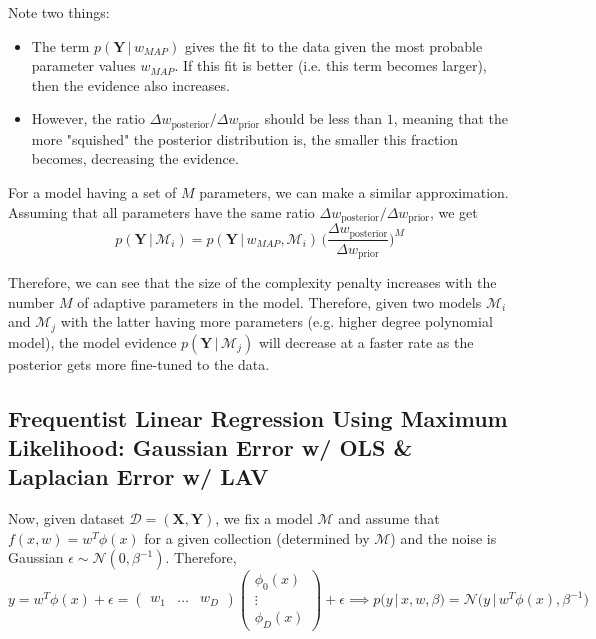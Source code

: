   Note two things:
  \begin{itemize}
    \item The term $p(\mathbf{Y}\,|\,w_{MAP})$ gives the fit to the data given the most probable parameter values $w_{MAP}$. If this fit is better (i.e. this term becomes larger), then the evidence also increases.
    \item However, the ratio $\Delta w_{\text{posterior}}/\Delta w_{\text{prior}}$ should be less than $1$, meaning that the more "squished" the posterior distribution is, the smaller this fraction becomes, decreasing the evidence.
  \end{itemize}

  For a model having a set of $M$ parameters, we can make a similar approximation. Assuming that all parameters have the same ratio $\Delta w_{\text{posterior}}/\Delta w_{\text{prior}}$, we get
  \begin{equation}
    p(\mathbf{Y}\,|\,\mathcal{M}_i) = p(\mathbf{Y}\,|\, w_{MAP}, \mathcal{M}_i) \, \bigg(\frac{\Delta w_{\text{posterior}}}{\Delta w_{\text{prior}}} \bigg)^M
  \end{equation}

  Therefore, we can see that the size of the complexity penalty increases with the number $M$ of adaptive parameters in the model. Therefore, given two models $\mathcal{M}_i$ and $\mathcal{M}_j$ with the latter having more parameters (e.g. higher degree polynomial model), the model evidence $p(\mathbf{Y}\,|\,\mathcal{M}_j)$ will decrease at a faster rate as the posterior gets more fine-tuned to the data.

\subsection{Frequentist Linear Regression Using Maximum Likelihood: Gaussian Error w/ OLS \& Laplacian Error w/ LAV}

  Now, given dataset $\mathcal{D} = (\mathbf{X}, \mathbf{Y})$, we fix a model $\mathcal{M}$ and assume that $f(x, w) = w^T \phi(x)$ for a given collection (determined by $\mathcal{M}$) and the noise is Gaussian $\epsilon \sim \mathcal{N}(0, \beta^{-1})$. Therefore,
  \begin{equation}
    y = w^T \phi(x) + \epsilon = \begin{pmatrix} w_1 & \ldots & w_D \end{pmatrix} \begin{pmatrix} \phi_0 (x) \\ \vdots \\ \phi_D (x) \end{pmatrix} + \epsilon \implies p(y\,|\,x, w, \beta) = \mathcal{N} \big(y\,|\, w^T \phi(x), \beta^{-1} \big)
  \end{equation}

